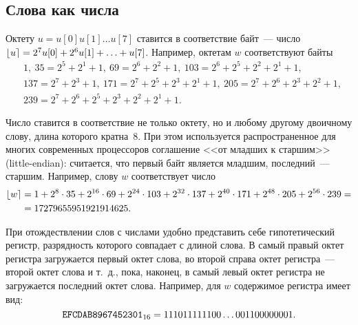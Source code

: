 \subsection{Слова как числа}

Октету $u=u[0]u[1]\ldots u[7]$ ставится в соответствие байт~--- 
число $\lfloor u\rceil=2^7u[0]+2^6 u[1]+\ldots + u[7]$. 
Например, октетам $w$ соответствуют байты
\begin{align*}
&
1,\ 
35=2^5+2^1+1,\ 
69=2^6+2^2+1,\ 
103=2^6+2^5+2^2+2^1+1,\\
%
&
137=2^7+2^3+1,\ 
171=2^7+2^5+2^3+2^1+1,\
205=2^7+2^6+2^3+2^2+1,\\
&
239=2^7+2^6+2^5+2^3+2^2+2^1+1.
\end{align*}

Число ставится в соответствие не только октету, но и любому другому
двоичному слову, длина которого кратна~$8$. 
%
При этом используется распространенное для многих современных 
процессоров соглашение <<от младших к старшим>> (little-endian):
считается, что первый байт является младшим, последний~--- старшим.
Например, слову $w$ соответствует число
\begin{align*}
\lfloor w\rceil&=
1 + 2^{8}\cdot 35 + 2^{16}\cdot 69 + 2^{24}\cdot 103 + 
2^{32}\cdot 137 + 2^{40}\cdot 171 + 2^{48}\cdot 205 + 2^{56}\cdot 239 =\\
& = 17279655951921914625.
\end{align*}

При отождествлении слов с числами удобно представить себе 
гипотетический регистр, разрядность которого совпадает с длиной слова.
В самый правый октет регистра загружается первый октет слова, 
во второй справа октет регистра~--- второй октет слова и т.~д.,
пока, наконец, в самый левый октет регистра не загружается последний 
октет слова.
%
Например, для $w$ содержимое регистра имеет 
вид:
$$
\hex{EFCDAB8967452301}
=
%
11101111 1100 \ldots 0011 00000001.
$$

